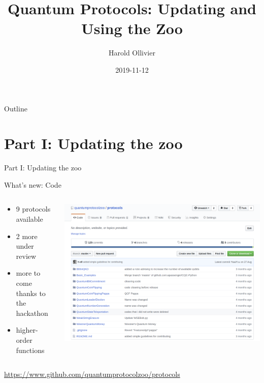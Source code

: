 \documentclass[presentation]{beamer}
\author{Harold Ollivier}
\date{2019-11-12}
\title{Quantum Protocols: Updating and Using the Zoo}
\begin{document}
\maketitle
\begin{frame}{Outline}
\tableofcontents
\end{frame}



\section{Part I: Updating the zoo}
\label{sec:org929f160}
\begin{frame}[label={sec:orgc43b9c8}]{Part I: Updating the zoo}
\end{frame}
\begin{frame}[label={sec:org4d3113c}]{What's new: Code}
\begin{columns}
\begin{column}{0.4\columnwidth}
\begin{itemize}
\item 9 protocols available
\item 2 more under review
\item more to come thanks to the hackathon
\item higher-order functions
\end{itemize}
\end{column}

\begin{column}{0.6\columnwidth}
\begin{center}
\includegraphics[width=.9\linewidth]{./figs/qpz_protocols.png}
\end{center}
\end{column}
\end{columns}

\begin{block}{}
\url{https://www.github.com/quantumprotocolzoo/protocols}
\end{block}
\end{frame}
\end{document}
